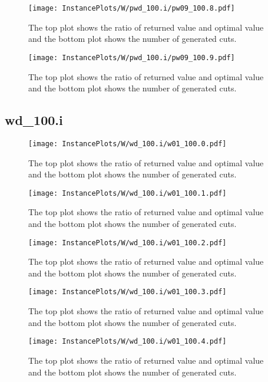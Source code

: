 \documentclass[10pt,a4paper]{article}
\begin{document}
\begin{figure}[H]
\texttt{[image: InstancePlots/W/pwd\_100.i/pw09\_100.8.pdf]}
\caption{The top plot shows the ratio of returned value and optimal value     and the bottom plot shows the number of generated cuts.}
\end{figure}

\begin{figure}[H]
\texttt{[image: InstancePlots/W/pwd\_100.i/pw09\_100.9.pdf]}
\caption{The top plot shows the ratio of returned value and optimal value     and the bottom plot shows the number of generated cuts.}
\end{figure}

\subsection{wd\_100.i}
\begin{figure}[H]
\texttt{[image: InstancePlots/W/wd\_100.i/w01\_100.0.pdf]}
\caption{The top plot shows the ratio of returned value and optimal value     and the bottom plot shows the number of generated cuts.}
\end{figure}

\begin{figure}[H]
\texttt{[image: InstancePlots/W/wd\_100.i/w01\_100.1.pdf]}
\caption{The top plot shows the ratio of returned value and optimal value     and the bottom plot shows the number of generated cuts.}
\end{figure}

\begin{figure}[H]
\texttt{[image: InstancePlots/W/wd\_100.i/w01\_100.2.pdf]}
\caption{The top plot shows the ratio of returned value and optimal value     and the bottom plot shows the number of generated cuts.}
\end{figure}

\begin{figure}[H]
\texttt{[image: InstancePlots/W/wd\_100.i/w01\_100.3.pdf]}
\caption{The top plot shows the ratio of returned value and optimal value     and the bottom plot shows the number of generated cuts.}
\end{figure}

\begin{figure}[H]
\texttt{[image: InstancePlots/W/wd\_100.i/w01\_100.4.pdf]}
\caption{The top plot shows the ratio of returned value and optimal value     and the bottom plot shows the number of generated cuts.}
\end{figure}
\end{document}
